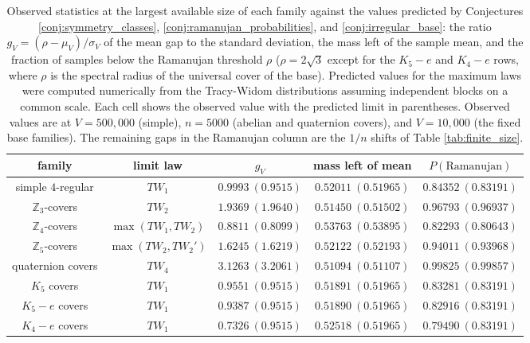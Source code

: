 \documentclass[12pt,oneside,english]{amsart}
\numberwithin{equation}{section}
\numberwithin{figure}{section}
\numberwithin{table}{section}
\theoremstyle{plain}
\numberwithin{thm}{section}
\theoremstyle{plain}
\theoremstyle{plain}
\theoremstyle{plain}
\theoremstyle{definition}
\theoremstyle{definition}
\theoremstyle{definition}
\theoremstyle{remark}
\providecommand{\tabularnewline}{\\}
\begin{document}
\begin{table}[tbp]
\begin{centering}
{\footnotesize\setlength{\tabcolsep}{4pt}
\begin{tabular}{|c|c|c|c|c|}
\hline
family & limit law & $g_{V}$ & mass left of mean & $P(\text{Ramanujan})$\tabularnewline
\hline
simple $4$-regular & $TW_{1}$ & $0.9993\ (0.9515)$ & $0.52011\ (0.51965)$ & $0.84352\ (0.83191)$\tabularnewline
\hline
$\mathbb{Z}_{3}$-covers & $TW_{2}$ & $1.9369\ (1.9640)$ & $0.51450\ (0.51502)$ & $0.96793\ (0.96937)$\tabularnewline
\hline
$\mathbb{Z}_{4}$-covers & $\max(TW_{1},TW_{2})$ & $0.8811\ (0.8099)$ & $0.53763\ (0.53895)$ & $0.82293\ (0.80643)$\tabularnewline
\hline
$\mathbb{Z}_{5}$-covers & $\max(TW_{2},TW_{2}')$ & $1.6245\ (1.6219)$ & $0.52122\ (0.52193)$ & $0.94011\ (0.93968)$\tabularnewline
\hline
quaternion covers & $TW_{4}$ & $3.1263\ (3.2061)$ & $0.51094\ (0.51107)$ & $0.99825\ (0.99857)$\tabularnewline
\hline
$K_{5}$ covers & $TW_{1}$ & $0.9551\ (0.9515)$ & $0.51891\ (0.51965)$ & $0.83281\ (0.83191)$\tabularnewline
\hline
$K_{5}-e$ covers & $TW_{1}$ & $0.9387\ (0.9515)$ & $0.51890\ (0.51965)$ & $0.82916\ (0.83191)$\tabularnewline
\hline
$K_{4}-e$ covers & $TW_{1}$ & $0.7326\ (0.9515)$ & $0.52518\ (0.51965)$ & $0.79490\ (0.83191)$\tabularnewline
\hline
\end{tabular}}
\par\end{centering}
\caption{\label{tab:predicted_observed}Observed statistics at the largest
available size of each family against the values predicted by Conjectures
\ref{conj:symmetry_classes}, \ref{conj:ramanujan_probabilities},
and \ref{conj:irregular_base}: the ratio $g_{V}=\left(\rho-\mu_{V}\right)/\sigma_{V}$
of the mean gap to the standard deviation, the mass left of the sample
mean, and the fraction of samples below the Ramanujan threshold $\rho$
($\rho=2\sqrt{3}$ except for the $K_{5}-e$ and $K_{4}-e$ rows, where
$\rho$ is the spectral radius of the universal cover of the base).
Predicted values for the maximum laws were computed numerically from
the Tracy-Widom distributions assuming independent blocks on a common
scale. Each cell shows the observed value with the predicted limit
in parentheses. Observed values are at $V=500{,}000$ (simple), $n=5000$
(abelian and quaternion covers), and $V=10{,}000$ (the fixed base
families). The remaining gaps in the Ramanujan column are the $1/n$
shifts of Table \ref{tab:finite_size}.}
\end{table}
\end{document}
